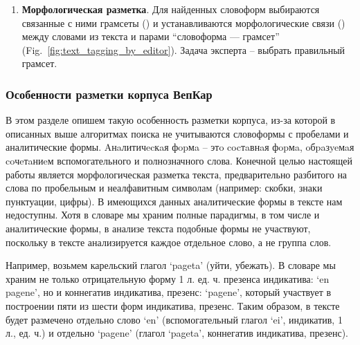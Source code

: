\begin{enumerate}
\item \textbf{Морфологическая разметка}. 
Для найденных словоформ выбираются связанные с ними грамсеты  () и устанавливаются морфологические связи () между словами из текста и парами ``словоформа — грамсет'' (Fig.~\ref{fig:text_tagging_by_editor}). 
Задача эксперта -- выбрать правильный грамсет.


\end{enumerate}

 
\subsubsection{Особенности разметки корпуса ВепКар}\label{corpus_peculiarities}
В этом разделе опишем такую особенность разметки корпуса, из-за которой в описанных выше алгоритмах поиска не учитываются словоформы с пробелами и аналитические формы.
Aнaлитичecкaя фopмa – этo cocтaвнaя фopмa, oбpaзyeмaя coчeтaниeм вспомогательного и полнозначного слова.
Конечной целью настоящей работы является морфологическая разметка текста, предварительно разбитого на слова по пробельным и неалфавитным символам (например: скобки, знаки пунктуации, цифры). 
В имеющихся данных аналитические формы в тексте нам недоступны. 
Хотя в словаре мы храним полные парадигмы, в том числе и аналитические формы, в анализе текста подобные формы не участвуют, поскольку в тексте анализируется каждое отдельное слово, а не группа слов. 

Например, возьмем карельский глагол ‘pageta’ (уйти, убежать).
В словаре мы храним не только отрицательную форму 1 л. ед. ч. презенса индикатива: ‘en pagene’, но и коннегатив индикатива, презенс: ‘pagene’, который участвует в построении пяти из шести форм индикатива, презенс. 
Таким образом, в тексте будет размечено отдельно слово ‘en’ (вспомогательный глагол ‘ei’, индикатив, 1 л., ед. ч.) и отдельно ‘pagene’ (глагол ‘pageta’, коннегатив индикатива, презенс).
